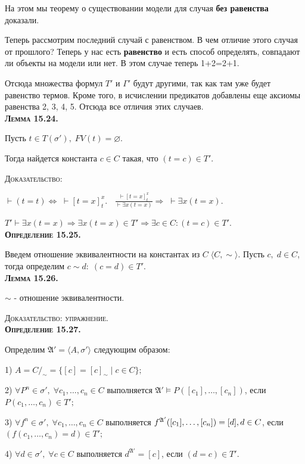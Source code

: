 \documentclass[18pt, a4paper]{extarticle}
\newcommand{\Gm}{\Gamma}
\newcommand{\vd}{\vdash}
\newcommand{\vD}{\vDash}
\newcommand{\mA}{\mathfrak{A}}
\newcommand{\dok}{\textsc{Доказательство:}}
\newcommand{\dokup}{\textsc{Доказательство: упражнение.}}
\begin{document}
На этом мы теорему о существовании модели для случая \textbf{без равенства} доказали.

Теперь рассмотрим последний случай с равенством.
В чем отличие этого случая от прошлого? Теперь у нас есть \textbf{равенство} и есть способ определять, совпадают ли объекты на модели или нет. В этом случае теперь 1+2=2+1. 

Отсюда множества формул $T'$ и $\Gm'$ будут другими, так как там уже будет равенство термов. Кроме того, в исчислении предикатов добавлены еще аксиомы равенства 2, 3, 4, 5. Отсюда все отличия этих случаев.\\

\textbf{\textsc{Лемма 15.24.}} 

Пусть $t\in T(\sigma'),\;FV(t)=\varnothing$. 

Тогда найдется константа $c\in C$ такая, что $(t = c)\in T'$.

\dok

$\vd(t=t)\Leftrightarrow \;\vd[t=x]^x_t.\;\;$ $\displaystyle\frac{\vd[t=x]^x_t}{\vd\exists x (t=x)}\Rightarrow\; \vd \exists x (t=x)$.

$T'\vd\exists x (t=x)\Rightarrow \exists x(t=x)\in T' \Rightarrow \exists c\in C: (t=c)\in T'$.\\

\textbf{\textsc{Определение 15.25.}} 

Введем отношение эквивалентности на константах из $C\;\langle C,\sim\rangle$. Пусть $c,\;d\in C$, тогда определим $c\sim d:\;(c=d)\in T'$.\\

\textbf{\textsc{Лемма 15.26.}} 

$\sim$ -  отношение эквивалентности.

\dokup\\

\textbf{\textsc{Определение 15.27.}} 

Определим $\mA'=\langle A,\sigma'\rangle$ следующим образом:

1) $A=C/_\sim=\{[c]=[c]_\sim\;|\;c\in C\};$

2) $\forall P^n\in\sigma',\;\forall c_1,\dots,c_n\in C$ выполняется $\mA'\vD P([c_1],\dots,[c_n])$, если $P(c_1,\dots,c_n)\in T';$

3) $\forall f^n\in\sigma',\;\forall c_1,\dots,c_n\in C$ выполняется $f^{\mA'}([c_1],\dots,[c_n])=[d],\\d\in C$, если $(f(c_1,\dots,c_n)=d)\in T';$

4) $\forall d\in\sigma',\;\forall c\in C$ выполняется $d^{\mA'}=[c]$, если $(d=c)\in T'$.\\
\end{document}
